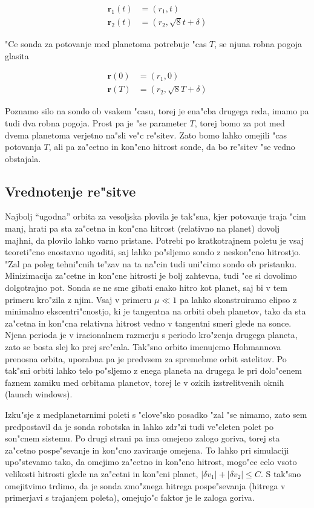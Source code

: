 \documentclass[a4paper,10pt]{article}
\renewcommand{\vec}{\mathbf}
\begin{document}
\begin{align}
 \vec r_1(t) &= (r_1, t) \\
 \vec r_2(t) &= (r_2, \sqrt{8}t + \delta)
\end{align}

"Ce sonda za potovanje med planetoma potrebuje "cas $T$, se njuna robna pogoja glasita

\begin{align}
 \vec r(0) &= (r_1, 0) \\
 \vec r(T) &= (r_2, \sqrt{8} T + \delta)
\end{align}

Poznamo silo na sondo ob vsakem "casu, torej je ena"cba drugega reda, imamo pa tudi dva robna pogoja. Prost pa je "se parameter $T$, torej bomo za pot med dvema planetoma verjetno na"sli ve"c re"sitev. Zato bomo lahko omejili "cas potovanja $T$, ali pa za"cetno in kon"cno hitrost sonde, da bo re"sitev "se vedno obstajala. 

\subsection{Vrednotenje re"sitve}

Najbolj ``ugodna'' orbita za vesoljska plovila je tak"sna, kjer potovanje traja "cim manj, hrati pa sta za"cetna in kon"cna hitrost (relativno na planet) dovolj majhni, da plovilo lahko varno pristane. Potrebi po kratkotrajnem poletu je vsaj teoreti"cno enostavno ugoditi, saj lahko po"sljemo sondo z neskon"cno hitrostjo. "Zal pa poleg tehni"cnih te"zav na ta na"cin tudi uni"cimo sondo ob pristanku. 
Minizimacija za"cetne in kon"cne hitrosti je bolj zahtevna, tudi "ce si dovolimo dolgotrajno pot. Sonda se ne sme gibati enako hitro kot planet, saj bi v tem primeru kro"zila z njim. Vsaj v primeru $\mu \ll 1$ pa lahko skonstruiramo elipso z minimalno ekscentri"cnostjo, ki je tangentna na orbiti obeh planetov, tako da sta za"cetna in kon"cna relativna hitrost vedno v tangentni smeri glede na sonce. 
Njena perioda je v iracionalnem razmerju s periodo kro"zenja drugega planeta, zato se bosta slej ko prej sre"cala. Tak"sno orbito imenujemo Hohmannova prenosna orbita, uporabna pa je predvsem za spremebme orbit satelitov. Po tak"sni orbiti lahko telo po"sljemo z enega planeta na drugega le pri dolo"cenem faznem zamiku med orbitama planetov, torej le v ozkih izstrelitvenih oknih (launch windows). 

Izku"sje z medplanetarnimi poleti s "clove"sko posadko "zal "se nimamo, zato sem predpostavil da je sonda robotska in lahko zdr"zi tudi ve"cleten polet po son"cnem sistemu. Po drugi strani pa ima omejeno zalogo goriva, torej sta za"cetno pospe"sevanje in kon"cno zaviranje omejena. To lahko pri simulaciji upo"stevamo tako, da omejimo za"cetno in kon"cno hitrost, mogo"ce celo 
vsoto velikosti hitrosti glede na za"cetni in kon"cni planet, $|\delta v_1| + |\delta v_2| \leq C$. S tak"sno omejitvimo trdimo, da je sonda zmo"znega hitrega pospe"sevanja (hitrega v primerjavi s trajanjem poleta), omejujo"c faktor je le zaloga goriva. 
\end{document}

